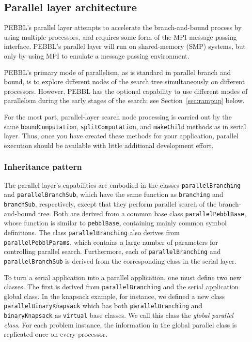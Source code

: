 \subsection{Parallel layer architecture}

PEBBL's parallel layer attempts to accelerate the branch-and-bound
process by using multiple processors, and requires some form of the
MPI message passing interface.  PEBBL's parallel layer will run on
shared-memory (SMP) systems, but only by using MPI to emulate a
message passing environment.  

PEBBL's primary mode of parallelism, as is standard in parallel branch
and bound, is to explore different nodes of the search tree
simultaneously on different processors.  However, PEBBL has the
optional capability to use different modes of parallelism during the
early stages of the search; see Section~\ref{sec:rampup} below.

For the most part, parallel-layer search node processing is carried
out by the same \texttt{boundComputation}, \texttt{splitComputation},
and \texttt{makeChild} methods as in serial layer.  Thus, once you
have created these methods for your application, parallel execution
should be available with little additional development effort.


\subsubsection{Inheritance pattern}

The parallel layer's capabilities are embodied in the classes
\texttt{parallelBranching} and {\tt paral\-lel\-BranchSub}, which have the
same function as \texttt{branching} and \texttt{branchSub},
respectively, except that they perform parallel search of the
branch-and-bound tree.  Both are derived from a common base
class \texttt{parallelPebblBase}, whose function is similar to
\texttt{pebblBase}, containing mainly common symbol definitions.
The class \texttt{parallelBranching} also derives from
\texttt{parallelPebblParams}, which contains a large number of
parameters for controlling parallel search.  Furthermore, each of
\texttt{parallelBranching} and {\tt parallelBranchSub} is derived from
the corresponding class in the serial layer.

To turn a serial application into a parallel application, one must
define two new classes.  The first is derived from
\texttt{parallelBranching} and the serial application global class.
In the knapsack example, for instance, we defined a new class
\texttt{parallelBinaryKnapsack} which has both
\texttt{parallelBranching} and \texttt{binaryKnapsack} as
\texttt{virtual} base classes.  We call this class the \emph{global
parallel class}.  For each problem instance, the information in the
global parallel class is replicated once on every processor.

